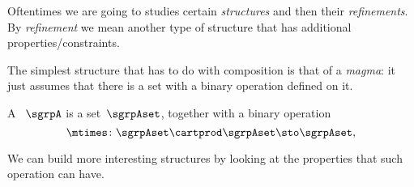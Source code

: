 

\label{ch:monoids}

Oftentimes we are going to studies certain \emph{structures} and then their \emph{refinements}.
By \emph{refinement} we mean another type of structure that has additional properties/constraints.

The simplest structure that has to do with composition is that of a \emph{magma}: it just assumes that there is a set with a binary operation defined on it.

\begin{definition}[Magma]
  \label{def:magma}
  A \emph{}~$\sgrpA$ is a set~$\sgrpAset$, together with a binary operation
  \begin{equation}
    \mtimes  \colon \sgrpAset \cartprod \sgrpAset \sto \sgrpAset,
  \end{equation}
 \end{definition}

We can build more interesting structures by looking at the properties that such operation can have.













